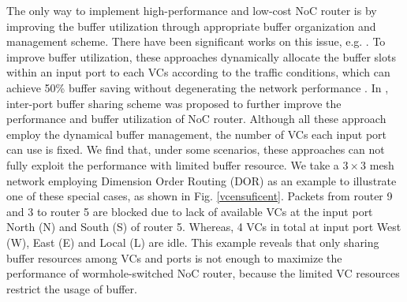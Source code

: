\documentclass[10pt,conference]{IEEEtran}
\begin{document}
The only way to implement high-performance and low-cost NoC router is by improving the buffer utilization through appropriate buffer organization and management scheme. There have been significant works on this issue, e.g. \cite{NPKV06,4555894,6310960}. To improve buffer utilization, these approaches dynamically allocate the buffer slots within an input port to each VCs according to the traffic conditions, which can achieve 50\% buffer saving without degenerating the network performance \cite{NPKV06}. In \cite{Neishaburi:2009:RAN:1531542.1531658}\cite{5770788},
inter-port buffer sharing scheme was proposed to further improve the performance and buffer utilization of NoC router. Although all these approach employ the dynamical buffer management, the number of VCs each input port can use is fixed. We find that, under some scenarios, these approaches can not fully exploit the performance with limited buffer resource. We take a $3\times 3$ mesh network employing Dimension Order Routing (DOR) as an example to illustrate one of these special cases, as shown in Fig. \ref{vcensuficent}. Packets from router 9 and 3 to router 5 are blocked due to lack of available VCs at the input port North (N) and South (S) of router 5. Whereas, 4 VCs in total at input port West (W), East (E) and Local (L) are idle. This example reveals that only sharing buffer resources among VCs and ports is not enough to maximize the performance of wormhole-switched NoC router, because the limited VC resources restrict the usage of buffer.

\end{document}
